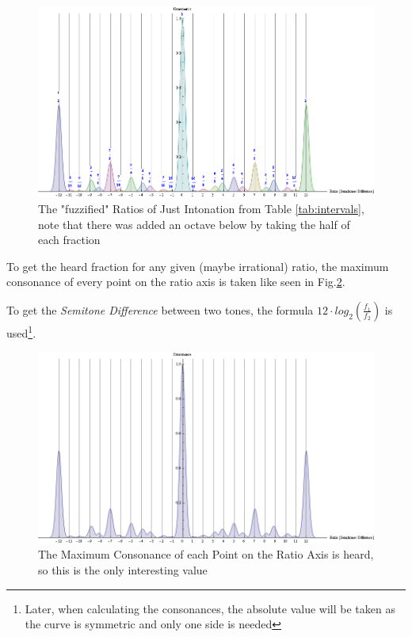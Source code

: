 \documentclass[12pt,a4paper,titlepage,oneside]{report}
\begin{document}
\begin{figure}[!ht]
\includegraphics[width=\textwidth]{images/just_bell.png}
\centering
\caption{The "fuzzified" Ratios of Just Intonation from Table \ref{tab:intervals}, note that there was added an octave below by taking the half of each fraction}
\label{fig:just_bell}
\end{figure}

To get the heard fraction for any given (maybe irrational) ratio, the maximum consonance of every point on the ratio axis is taken like seen in Fig.\ref{fig:just_bell_max}.

To get the \textit{Semitone Difference} between two tones, the formula $12 \cdot log_2(\frac{f_1}{f_2})$ is used\footnote{Later, when calculating the consonances, the absolute value will be taken as the curve is symmetric and only one side is needed}.

\begin{figure}[!ht]
\includegraphics[width=\textwidth]{images/just_bell_max.png}
\centering
\caption{The Maximum Consonance of each Point on the Ratio Axis is heard, so this is the only interesting value}
\label{fig:just_bell_max}
\end{figure}
\end{document}
